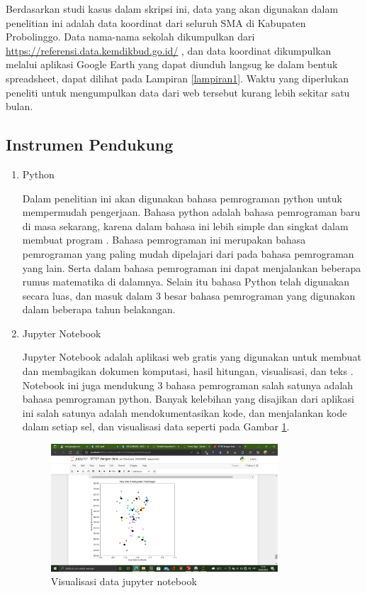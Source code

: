 Berdasarkan studi kasus dalam skripsi ini, data yang akan digunakan dalam penelitian ini adalah data koordinat dari seluruh SMA di Kabupaten Probolinggo. Data nama-nama sekolah dikumpulkan dari \url{https://referensi.data.kemdikbud.go.id/} \cite{kemendikbud}, dan data koordinat dikumpulkan melalui aplikasi Google Earth yang dapat diunduh langsug ke dalam bentuk spreadsheet, dapat dilihat pada Lampiran \ref{lampiran1}. Waktu yang diperlukan peneliti untuk mengumpulkan data dari web tersebut kurang lebih sekitar satu bulan.

\subsection{Instrumen Pendukung}
\begin{enumerate}
    \item Python
    
    Dalam penelitian ini akan digunakan bahasa pemrograman python untuk mempermudah pengerjaan. Bahasa python adalah bahasa pemrograman baru di masa sekarang, karena dalam bahasa ini lebih simple dan singkat dalam membuat program \cite{syahrudin2018input}. Bahasa pemrograman ini merupakan bahasa pemrograman yang paling mudah dipelajari dari pada bahasa pemrograman yang lain. Serta dalam bahasa pemrograman ini dapat menjalankan beberapa rumus matematika di dalamnya. Selain itu bahasa Python telah digunakan secara luas, dan masuk dalam 3 besar bahasa pemrograman yang digunakan dalam beberapa tahun belakangan.
    
    \item Jupyter Notebook
    
    Jupyter Notebook adalah aplikasi web gratis yang digunakan untuk membuat dan membagikan dokumen komputasi, hasil hitungan, visualisasi, dan teks \cite{Kluyver2016jupyter}. Notebook ini juga mendukung 3 bahasa pemrograman salah satunya adalah bahasa pemrograman python. Banyak kelebihan yang disajikan dari aplikasi ini salah satunya adalah mendokumentasikan kode, dan menjalankan kode dalam setiap sel, dan visualisasi data seperti pada Gambar \ref{fig:visjupyter}.

\begin{figure}[H]
  \centering
  \includegraphics[width=0.8\textwidth]{Gambar/visualisasi jupyter.png}
  \caption{Visualisasi data jupyter notebook}
  \label{fig:visjupyter}
\end{figure}


\end{enumerate}
